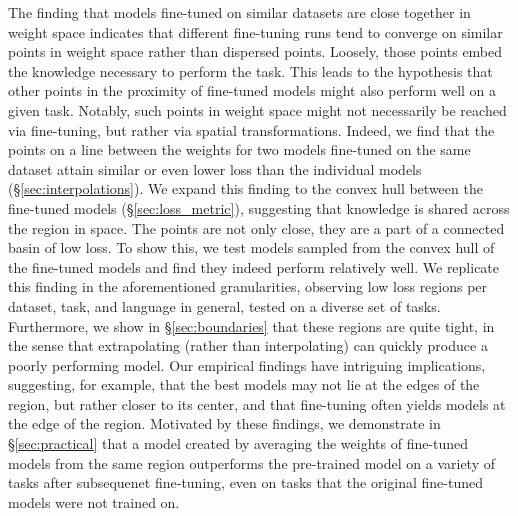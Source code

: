 \documentclass[nohyperref]{article}
\theoremstyle{plain}
\theoremstyle{definition}
\theoremstyle{remark}
\begin{document}
The finding that models fine-tuned on similar datasets are close together in weight space indicates that different fine-tuning runs tend to converge on similar points in weight space rather than dispersed points. Loosely, those points embed the knowledge necessary to perform the task. %
This leads to the hypothesis that other points in the proximity of fine-tuned models might also perform well on a given task. Notably, such points in weight space might not necessarily be reached via fine-tuning, but rather via spatial transformations. Indeed, we find that the points on a line between the weights for two models fine-tuned on the same dataset attain similar or even lower loss than the individual models (\S\ref{sec:interpolations}). We expand this finding to the convex hull between the fine-tuned models (\S\ref{sec:loss_metric}), suggesting that knowledge is shared across the region in space. The points are not only close, they are a part of a connected basin of low loss. To show this, we test models sampled from the convex hull of the fine-tuned models and find they indeed perform relatively well. We replicate this finding in the aforementioned granularities, observing low loss regions per dataset, task, and language in general, tested on a diverse set of tasks. Furthermore, we show in \S\ref{sec:boundaries} that these regions are quite tight, in the sense that extrapolating (rather than interpolating) can quickly produce a poorly performing model.%
Our empirical findings have intriguing implications, suggesting, for example, that the best models may not lie at the edges of the region, but rather closer to its center, and that fine-tuning often yields models at the edge of the region. 
Motivated by these findings, we demonstrate in \S\ref{sec:practical} that a model created by averaging the weights of fine-tuned models from the same region outperforms the pre-trained model on a variety of tasks after subsequenet fine-tuning, even on tasks that the original fine-tuned models were not trained on.
\end{document}
